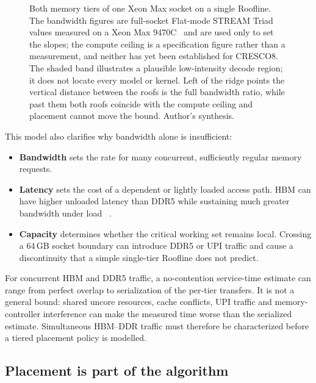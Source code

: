 \begin{figure}[htbp]
{%
}
\caption{Both memory tiers of one Xeon Max socket on a single Roofline.
The bandwidth figures are full-socket Flat-mode STREAM Triad values
measured on a Xeon Max 9470C~\cite{ibeid2025aurora} and are used only to
set the slopes; the compute ceiling is a specification figure rather
than a measurement, and neither has yet been established for CRESCO8.
The shaded band illustrates a plausible low-intensity decode region; it
does not locate every model or kernel.  Left of the ridge points the
vertical distance between the roofs is the full bandwidth ratio, while
past them both roofs coincide with the compute ceiling and placement
cannot move the bound.  Author's synthesis.}
\label{fig:roofline}
\end{figure}


This model also clarifies why bandwidth alone is insufficient:

\begin{itemize}
  \item \textbf{Bandwidth} sets the rate for many concurrent,
        sufficiently regular memory requests.
  \item \textbf{Latency} sets the cost of a dependent or lightly loaded
        access path.  HBM can have higher unloaded latency than DDR5
        while sustaining much greater bandwidth under load
        ~\cite{ibeid2025aurora}.
  \item \textbf{Capacity} determines whether the critical working set
        remains local.  Crossing a 64\,GB socket boundary can introduce
        DDR5 or UPI traffic and cause a discontinuity that a simple
        single-tier Roofline does not predict.
\end{itemize}

For concurrent HBM and DDR5 traffic, a no-contention service-time
estimate can range from perfect overlap to serialization of the
per-tier transfers.  It is not a general bound: shared uncore resources,
cache conflicts, UPI traffic and memory-controller interference can make
the measured time worse than the serialized estimate.  Simultaneous
HBM--DDR traffic must therefore be characterized before a tiered
placement policy is modelled.

\subsection{Placement is part of the algorithm}

